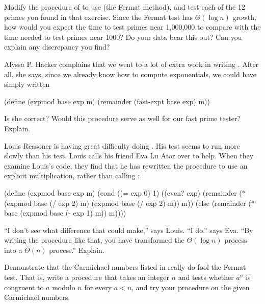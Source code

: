 \begin{exerciseGroup}
\label{Exercise 1.24}
 Modify the
 procedure of  to use
 (the Fermat method), and test each of the 12 primes you
found in that exercise.  Since the Fermat test has \( \Theta(\log n) \)
growth, how would you expect the time to test primes near 1,000,000 to
compare with the time needed to test primes near 1000?  Do your data bear this
out?  Can you explain any discrepancy you find?

\label{Exercise 1.25}
 Alyssa P. Hacker complains that
we went to a lot of extra work in writing .  After all, she says,
since we already know how to compute exponentials, we could have simply written

\begin{codeBlock}
(define (expmod base exp m)
  (remainder (fast-expt base exp) m))
\end{codeBlock}

Is she correct?  Would this procedure serve as well for our fast prime tester?
Explain.

\label{Exercise 1.26}
 Louis Reasoner is having great
difficulty doing .  His  test seems to run
more slowly than his  test.  Louis calls his friend Eva Lu Ator
over to help.  When they examine Louis's code, they find that he has rewritten
the  procedure to use an explicit multiplication, rather than
calling :

\begin{codeBlock}
(define (expmod base exp m)
  (cond ((= exp 0) 1)
        ((even? exp)
         (remainder (* (expmod base (/ exp 2) m)
                       (expmod base (/ exp 2) m))
                    m))
        (else
         (remainder (* base
                       (expmod base (- exp 1) m))
                    m))))
\end{codeBlock}

``I don't see what difference that could make,'' says Louis.  ``I do.''  says
Eva.  ``By writing the procedure like that, you have transformed the
\( \Theta(\log n) \) process into a \( \Theta(n) \) process.''
Explain.

\label{Exercise 1.27}
 Demonstrate that the Carmichael
numbers listed in  really do fool the Fermat test.  That is,
write a procedure that takes an integer \( n \) and tests whether \( a^n \) is
congruent to \( a \) modulo \( n \) for every \( a < n \), and try your procedure
on the given Carmichael numbers.


\end{exerciseGroup}

